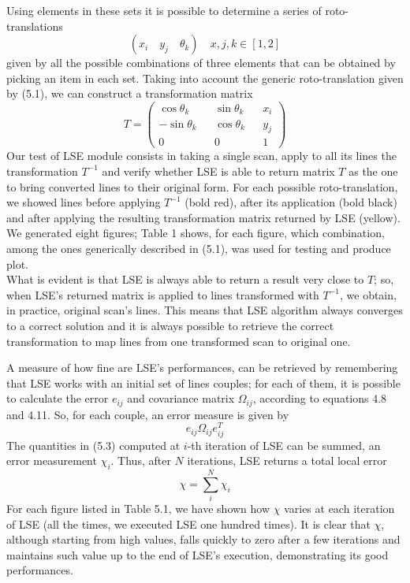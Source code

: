 \documentclass[a4paper, onecolumn]{report}
\begin{document}
Using elements in these sets it is possible to determine a series of roto-translations 
\begin{equation}
	(x_i \quad y_j \quad \theta_k) \quad x,j,k \in [1,2] 
\end{equation}
given by all the possible combinations of three elements that can be obtained by picking an item in each set. Taking into account the generic roto-translation given by (5.1), we can construct a transformation matrix
\begin{equation}
	T = \left(\begin{matrix}\cos\theta_k && \sin\theta_k && x_i \\ -\sin\theta_k && \cos\theta_k && y_j \\ 0 && 0 && 1\end{matrix}\right)
\end{equation}
Our test of LSE module consists in taking a single scan, apply to all its lines the transformation $T^{-1}$ and verify whether LSE is able to return matrix $T$ as the one to bring converted lines to their original form. For each possible roto-translation, we showed lines before applying $T^{-1}$ (bold red), after its application (bold black) and after applying the resulting transformation matrix returned by LSE (yellow). We generated eight figures; Table 1 shows, for each figure, which combination, among the ones generically described in (5.1), was used for testing and produce plot. \\
What is evident is that LSE is always able to return a result very close to $T$; so, when LSE's returned matrix is applied to lines transformed with $T^{-1}$, we obtain, in practice, original scan's lines. This means that LSE algorithm always converges to a correct solution and it is always possible to retrieve the correct transformation to map lines from one transformed scan to original one.

A measure of how fine are LSE's performances, can be retrieved by remembering that LSE works with an initial set of lines couples; for each of them, it is possible to calculate the error $e_{ij}$ and covariance matrix $\Omega_{ij}$, according to equations 4.8 and 4.11. So, for each couple, an error measure is given by 
\begin{equation}
	e_{ij}\Omega_{ij}e_{ij}^T
\end{equation}
The quantities in (5.3) computed at $i$-th iteration of LSE can be summed, an error measurement $\chi_i$. Thus, after $N$ iterations, LSE returns a total local error
\begin{equation}
	\chi = \sum_i^N \chi_i
\end{equation}
For each figure listed in Table 5.1, we have shown how $\chi$ varies at each iteration of LSE (all the times, we executed LSE one hundred times). It is clear that $\chi$, although starting from high values, falls quickly to zero after a few iterations and maintains such value up to the end of LSE's execution, demonstrating its good performances. 
\end{document}
